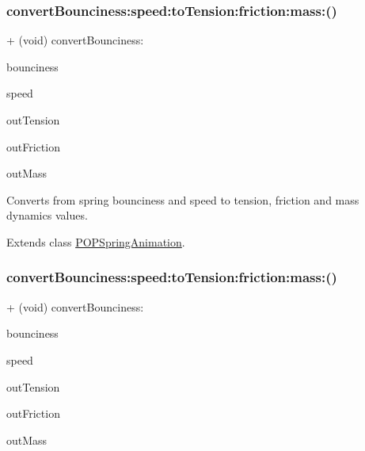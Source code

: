 \subsubsection{\texorpdfstring{convert\+Bounciness\+:speed\+:to\+Tension\+:friction\+:mass\+:()}{convertBounciness:speed:toTension:friction:mass:()}\hspace{0.1cm}{\footnotesize\ttfamily [1/3]}}
{\footnotesize\ttfamily + (void) convert\+Bounciness\+: \begin{DoxyParamCaption}\item[{(C\+G\+Float)}]{bounciness }\item[{speed:(C\+G\+Float)}]{speed }\item[{toTension:(C\+G\+Float $\ast$)}]{out\+Tension }\item[{friction:(C\+G\+Float $\ast$)}]{out\+Friction }\item[{mass:(C\+G\+Float $\ast$)}]{out\+Mass }\end{DoxyParamCaption}}

Converts from spring bounciness and speed to tension, friction and mass dynamics values. 

Extends class \mbox{\hyperlink{interface_p_o_p_spring_animation_a64169073c5afd559e939783a7f3f4065}{P\+O\+P\+Spring\+Animation}}.

\mbox{\label{category_p_o_p_spring_animation_07_p_o_p_animation_extras_08_a64169073c5afd559e939783a7f3f4065}} 
\subsubsection{\texorpdfstring{convert\+Bounciness\+:speed\+:to\+Tension\+:friction\+:mass\+:()}{convertBounciness:speed:toTension:friction:mass:()}\hspace{0.1cm}{\footnotesize\ttfamily [2/3]}}
{\footnotesize\ttfamily + (void) convert\+Bounciness\+: \begin{DoxyParamCaption}\item[{(C\+G\+Float)}]{bounciness }\item[{speed:(C\+G\+Float)}]{speed }\item[{toTension:(C\+G\+Float $\ast$)}]{out\+Tension }\item[{friction:(C\+G\+Float $\ast$)}]{out\+Friction }\item[{mass:(C\+G\+Float $\ast$)}]{out\+Mass }\end{DoxyParamCaption}}

